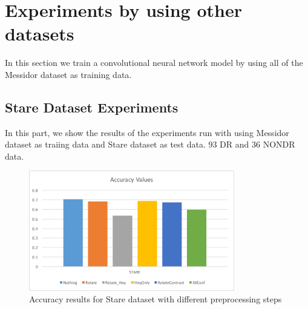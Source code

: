 \section{Experiments by using other datasets}
In this section we train a convolutional neural network model by using all of the Messidor dataset as training data. 
\subsection{Stare Dataset Experiments}
In this part, we show the results of the experiments run with using Messidor dataset as traiing data and Stare dataset as test data. 93 DR and 36 NONDR data. 

\begin{figure}[b]
\centering
\includegraphics[width=0.8\textwidth]{Figures/stare.png}
\caption{Accuracy results for Stare dataset with different preprocessing steps}
\label{delta}
\end{figure}